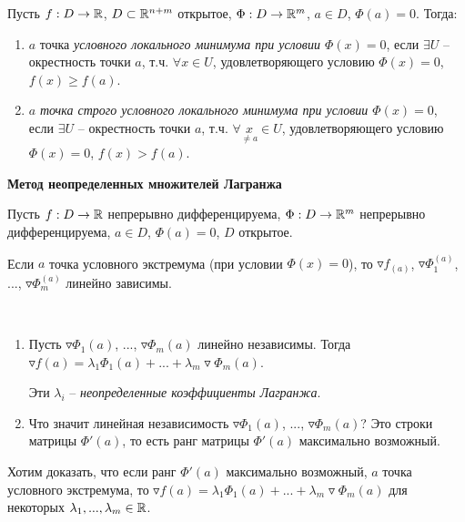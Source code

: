\begin{definition}
    Пусть $f: D\rightarrow \mathbb{R}$, $D\subset \mathbb{R}^{n+m}$ открытое, $\Phi: D\rightarrow \mathbb{R}^m$, $a\in D$, $\Phi(a) =0$. Тогда:
    \begin{enumerate}
        \item $a$ точка \textit{условного локального минимума при условии $\Phi(x) = 0$}, если $\exists U$ – окрестность точки $a$, т.ч. $\forall x\in U$, удовлетворяющего условию $\Phi(x)=0$, $f(x)\geq f(a)$.
        \item $a$ \textit{точка строго условного локального минимума при условии $\Phi(x) = 0$}, если $\exists U$ – окрестность точки $a$, т.ч. $\forall \underset{\neq a}{x}\in U$, удовлетворяющего условию $\Phi(x)=0$, $f(x)>f(a)$.
    \end{enumerate}
\end{definition}

\begin{theorem}
    \textbf{Метод неопределенных множителей Лагранжа}
    
    Пусть $f: D \rightarrow \mathbb{R}$ непрерывно дифференцируема,  $\Phi: D \rightarrow \mathbb{R}^m$ непрерывно дифференцируема, $a\in D$, $\Phi(a) =0$, $D$ открытое. 

    Если $a$ точка условного экстремума (при условии $\Phi(x) = 0$), то $\triangledown f_{(a)}$, $\triangledown \Phi_1^{(a)}$, ..., $\triangledown \Phi_m^{(a)}$ линейно зависимы.
\end{theorem}

\begin{remark}~
    \begin{enumerate}
        \item Пусть $\triangledown \Phi_1(a)$, ...,  $\triangledown \Phi_m(a)$ линейно независимы. Тогда $\triangledown f(a) =\lambda_1 \Phi_1(a)  + ... + \lambda_m\triangledown \Phi_m(a)$.

        Эти $\lambda_i$ – \textit{неопределенные коэффициенты Лагранжа}.
        \item Что значит линейная независимость $\triangledown \Phi_1(a)$, ...,  $\triangledown \Phi_m(a)$? Это строки матрицы $\Phi'(a)$, то есть ранг матрицы $\Phi'(a)$ максимально возможный.

    \end{enumerate}
\end{remark}

Хотим доказать, что если ранг $\Phi'(a)$ максимально возможный, $a$ точка условного экстремума, то  $\triangledown f(a) =\lambda_1 \Phi_1(a)  + ... + \lambda_m\triangledown \Phi_m(a)$ для некоторых $\lambda_1, ..., \lambda_m\in \mathbb{R}$.

